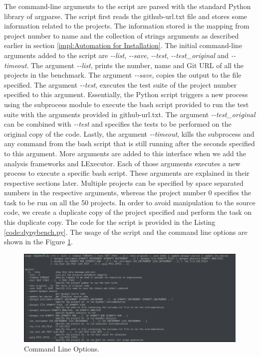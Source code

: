 The command-line arguments to the script are parsed with the standard Python library of argparse.
The script first reads the github-url.txt file and stores some information related to the projects.
The information stored is the mapping from project number to name and the collection of strings arguments as described earlier in section \ref{impl:Automation for Installation}.
The initial command-line arguments added to the script are \textit{\--\--list}, \textit{\--\--save}, \textit{\--\--test}, \textit{\--\--test\_original} and \textit{\--\--timeout}.
The argument \textit{\--\--list}, prints the number, name and Git URL of all the projects in the benchmark.
The argument \textit{\--\--save}, copies the output to the file specified.
The argument \textit{\--\--test}, executes the test suite of the project number specified to this argument.
Essentially, the Python script triggers a new process using the subprocess module to execute the bash script provided to run the test suite with the arguments provided in github-url.txt.
The argument \textit{\--\--test\_original} can be combined with \textit{\--\--test} and specifies the tests to be performed on the original copy of the code.  
Lastly, the argument \textit{\--\--timeout}, kills the subprocess and any command from the bash script that is still running after the seconds specified to this argument.  
More arguments are added to this interface when we add the analysis frameworks and LExecutor.
Each of those arguments executes a new process to execute a specific bash script.
These arguments are explained in their respective sections later.
Multiple projects can be specified by space separated numbers in the respective arguments, whereas the project number 0 specifies the task to be run on all the 50 projects.  
In order to avoid manipulation to the source code, we create a duplicate copy of the project specified and perform the task on this duplicate copy. 
The code for the script is provided in the Listing \ref{code:dypybench.py}.
The usage of the script and the command line options are shown in the Figure \ref{fig:command-line-options}.
\begin{figure}[ht]
    \centering
    \includegraphics[width=1\linewidth]{figures/implementation/command-line-options.png}
    \caption[Command Line Options]{\label{fig:command-line-options}Command Line Options.}
\end{figure}

